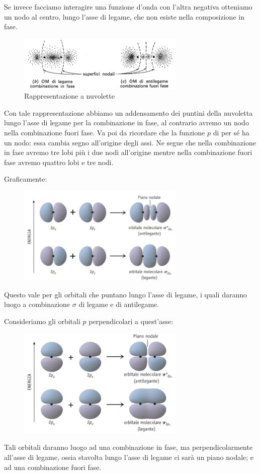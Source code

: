 Se invece facciamo interagire una funzione d'onda con l'altra negativa otteniamo un nodo al centro, lungo l'asse di legame, che non esiste nella composizione in fase.

\begin{figure}[htp]
    \centering
    \includegraphics[width=8cm]{immagini/orbitali_molecolari_pigreco_nuvoletta.png}
    \caption{Rappresentazione a nuvolette}
\end{figure}

Con tale rappresentazione abbiamo un addensamento dei puntini della nuvoletta lungo l'asse di legame per la combinazione in fase, al contrario avremo un nodo nella combinazione fuori fase. Va poi da ricordare che la funzione $p$ di per sé ha un nodo: essa cambia segno all'origine degli assi. Ne segue che nella combinazione in fase avremo tre lobi più i due nodi all'origine mentre nella combinazione fuori fase avremo quattro lobi e tre nodi.

Graficamente:

\begin{figure}[htp]
    \centering
    \includegraphics[width=8cm]{immagini/orbitali_sigma_p.png}
\end{figure}

Questo vale per gli orbitali che puntano lungo l'asse di legame, i quali daranno luogo a combinazione $\sigma$ di legame e di antilegame.

Consideriamo gli orbitali $p$ perpendicolari a quest'asse:

\begin{figure}[htp]
    \centering
    \includegraphics[width=8cm]{immagini/orbitale_pigreco_p.png}
\end{figure}
Tali orbitali daranno luogo ad una combinazione in fase, ma perpendicolarmente all'asse di legame, ossia stavolta lungo l'asse di legame ci sarà un piano nodale; e ad una combinazione fuori fase.

